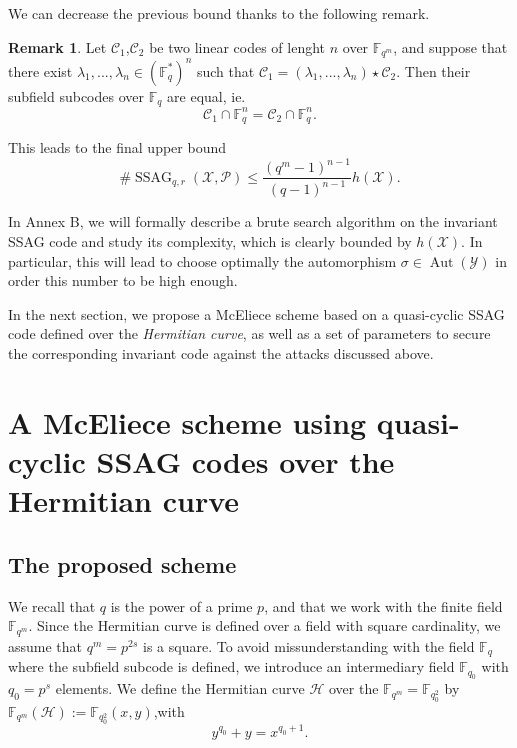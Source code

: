 \documentclass[10pt]{article}
\theoremstyle{definition}
\newtheorem{rq1}[thm]{Remark}
\theoremstyle{definition}
\theoremstyle{definition}
\newcommand{\C}{\mathcal{C}}
\newcommand{\calH}{\mathcal{H}}
\newcommand{\fqm}{\mathbb{F}_{q^m}}
\newcommand{\fq}{\mathbb{F}_q}
\newcommand{\X}{\mathcal{X}}
\newcommand{\Y}{\mathcal{Y}}
\newcommand{\PR}{\mathcal{P}}
\newcommand{\Aut}{\operatorname{Aut}}
\newcommand{\ssag}{\operatorname{SSAG}}
\begin{document}
We can decrease the previous bound thanks to the following remark.

\begin{rq1}
Let $\C_1$,$\C_2$ be two linear codes of lenght $n$ over $\fqm$, and suppose that there exist $\lambda_1,...,\lambda_n \in (\fq^*)^n$ such that $\C_1 = (\lambda_1,...,\lambda_n) \star \C_2$. Then their subfield subcodes over $\fq$ are equal, ie.
\[\C_1 \cap \fq^n = \C_2 \cap \fq^n.\]
\end{rq1}

This leads to the final upper bound 
\begin{equation} \label{nb of sssag}
 \#\ssag_{q,r}(\X,\PR) \leq \dfrac{(q^m-1)^{n-1}}{(q-1)^{n-1}}h(\X).
\end{equation} 

In Annex B, we will formally describe a brute search algorithm on the invariant SSAG code and study its complexity, which is clearly bounded by $h(\X)$. In particular, this will lead to choose optimally the automorphism $\sigma \in \Aut(\Y)$ in order this number to be high enough.

\vspace*{0.2cm}

In the next section, we propose a McEliece scheme based on a quasi-cyclic SSAG code defined over the \textit{Hermitian curve}, as well as a set of parameters to secure the corresponding invariant code against the attacks discussed above.


\section{A McEliece scheme using quasi-cyclic SSAG codes over the Hermitian curve}


\subsection{The proposed scheme}


We recall that $q$ is the power of a prime $p$, and that we work with the finite field $\fqm$. Since the Hermitian curve is defined over a field with square cardinality, we assume that $q^m = p^{2s}$ is a square. To avoid missunderstanding with the field $\fq$  where the subfield subcode is defined, we introduce an intermediary field $\mathbb{F}_{q_0}$ with $q_0 = p^s$ elements.   
We define the Hermitian curve $\calH$ over the $\fqm = \mathbb{F}_{q_0^2}$ by \\ $\fqm(\calH):=\mathbb{F}_{q_0^2}(x,y)$,with 
\begin{equation} \label{hermi}
y^{q_0}+y=x^{q_0+1}.
\end{equation}
\end{document}
